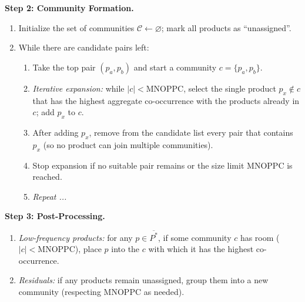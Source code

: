 \documentclass[11pt]{elsarticle}
\begin{document}
\begin{algorithm}[H]
\begin{algorithmic}[1]
    
\ContinuedFloat                %
\caption{Greedy Product Clustering and Station Assignment (continued)}
\Statex \textbf{Step 2: Community Formation.}
\begin{enumerate}[label=(\alph*)]
\item Initialize the set of communities $\mathcal{C}\leftarrow\varnothing$; mark all products as “unassigned”.
\item While there are candidate pairs left:
  \begin{enumerate}[label*=\arabic*.]
  \item Take the top pair $(p_a,p_b)$ and start a community $c=\{p_a,p_b\}$.
  \item \emph{Iterative expansion:} while $|c|<\mathrm{MNOPPC}$, select the single product \(p_x\notin c\) that has the highest aggregate co-occurrence with the products already in \(c\); add  \(p_x\) to \(c\).
  \item After adding $p_x$, remove from the candidate list every pair that contains $p_x$ (so no product can join multiple communities).
  \item Stop expansion if no suitable pair remains or the size limit $\mathrm{MNOPPC}$ is reached.
  \item \textit{Repeat ...}
  \end{enumerate}
\end{enumerate}

\medskip
\textbf{Step 3: Post-Processing.}
\begin{enumerate}[label=(\alph*)]
\item \emph{Low-frequency products:} for any $p\in \overline{P^*}$, if some community $c$ has room ($|c|<\mathrm{MNOPPC}$), place $p$ into the $c$ with which it has the highest co-occurrence.
\item \emph{Residuals:} if any products remain unassigned, group them into a new community (respecting $\mathrm{MNOPPC}$ as needed).
\end{enumerate}


\end{algorithmic}
\end{algorithm}
\end{document}
